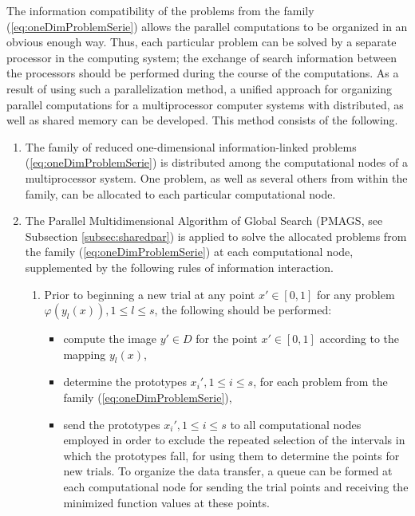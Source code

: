 \documentclass{gOMS2e}
\theoremstyle{plain}%
\theoremstyle{definition}
\theoremstyle{remark}
\begin{document}
\par
The information compatibility of the problems from the family (\ref{eq:oneDimProblemSerie}) allows the parallel
computations to be organized in an obvious enough way. Thus, each particular problem can
be solved by a separate processor in the computing system; the exchange of search information
between the processors should be performed during the course of the computations.
As a result of using such a parallelization method, a unified approach for organizing parallel
computations for a multiprocessor computer systems with distributed, as well as shared
memory can be developed. This method consists of the following.
\begin{enumerate}
  \item The family of reduced one-dimensional information-linked problems (\ref{eq:oneDimProblemSerie}) is
  distributed among the computational nodes of a multiprocessor system. One problem,
  as well as several others from within the family, can be allocated to each particular computational node.
  \item The Parallel Multidimensional Algorithm of Global Search (PMAGS, see Subsection \ref{subsec:sharedpar})
  is applied to solve the allocated problems from the family (\ref{eq:oneDimProblemSerie})
  at each computational node, supplemented by the following rules of information interaction.
  \begin{enumerate}
    \item Prior to beginning a new trial at any point \(x'\in [0,1]\) for any problem \(\varphi(y_l(x)),1\leqslant l\leqslant s\),
    the following should be performed:
    \begin{itemize}
      \item compute the image \(y'\in D\) for the point \(x'\in [0, 1]\) according to the mapping \(y_l(x)\),
      \item determine  the prototypes \(x_i',1\leqslant i\leqslant s\), for each
      problem from the family (\ref{eq:oneDimProblemSerie}),
      \item send the prototypes \(x_i',1\leqslant i\leqslant s\) to all computational
      nodes employed in order to exclude the repeated selection of the intervals in
      which the prototypes fall, for using them to determine the points for new trials.
      To organize the data transfer, a queue can be formed at each computational
      node for sending the trial points and receiving the minimized function values at these points.
    \end{itemize}

\end{enumerate}
\end{enumerate}
\end{document}
